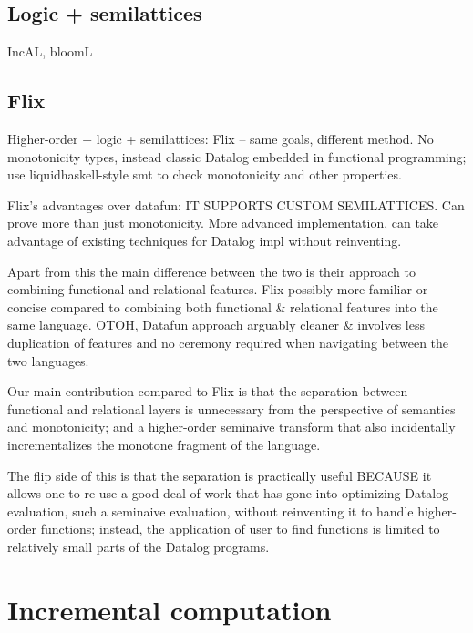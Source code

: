 \subsection{Logic + semilattices}
\label{section-logic+semilattices}

IncAL, bloomL


\subsection{Flix}
\label{section-flix}


Higher-order + logic + semilattices: Flix -- same goals, different method.
No monotonicity types, instead classic Datalog embedded in functional
programming; use liquidhaskell-style smt to check monotonicity and other
properties.

Flix's advantages over datafun: IT SUPPORTS CUSTOM SEMILATTICES. Can prove
more than just monotonicity. More advanced implementation, can take advantage
of existing techniques for Datalog impl without reinventing.

Apart from this the main difference between the two is their approach to
combining functional and relational features. Flix possibly more familiar or
concise compared to combining both functional \& relational features into the
same language. OTOH, Datafun approach arguably cleaner \& involves less
duplication of features and no ceremony required when navigating between the
two languages.

Our main contribution compared to Flix is that the separation between
functional and relational layers is unnecessary from the perspective of
semantics and monotonicity; and a higher-order seminaive transform that also
incidentally incrementalizes the monotone fragment of the language.

The flip side of this is that the separation is practically useful BECAUSE it 
allows one to re use a good deal of work that has gone into optimizing Datalog
evaluation, such a seminaive evaluation, without reinventing it to handle
higher-order functions; instead, the application of user to find functions is
limited to relatively small parts of the Datalog programs.


\section{Incremental computation}

